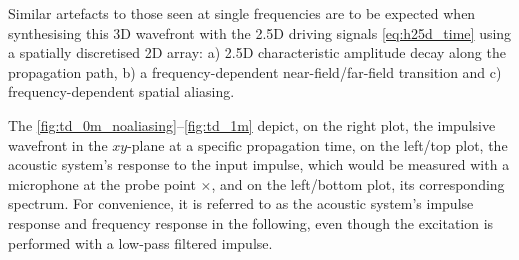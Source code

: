 Similar artefacts to those seen at single frequencies are to be expected
when synthesising this 3D wavefront with the 2.5D driving signals
\eqref{eq:h25d_time} using a spatially discretised 2D array:
a) 2.5D characteristic amplitude decay along the propagation path,
b) a frequency-dependent near-field/far-field transition and
c) frequency-dependent spatial aliasing.



The \myfigs\ref{fig:td_0m_noaliasing}--\ref{fig:td_1m} depict,
on the right plot,
the impulsive wavefront in the $xy$-plane at a specific propagation time,
on the left/top plot,
the acoustic system's response to the input impulse, which would be measured
with a microphone at the probe point $\times$,
and on the left/bottom plot,
its corresponding spectrum.
For convenience, it is referred to as the acoustic system's impulse response and
frequency response in the following, even though the excitation is
performed with a low-pass filtered impulse.
%



